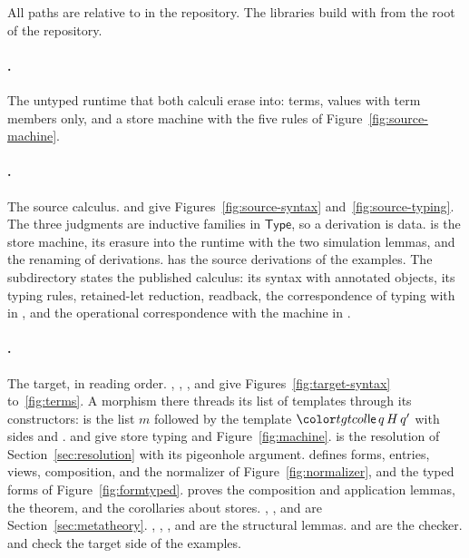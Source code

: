 All paths are relative to  in the repository. The libraries build with  from the root of the repository.

\paragraph{.}
The untyped runtime that both calculi erase into: terms, values with term members only, and a store machine with the five rules of Figure~\ref{fig:source-machine}.

\paragraph{.}
The source calculus.  and  give Figures~\ref{fig:source-syntax} and~\ref{fig:source-typing}. The three judgments are inductive families in $\mathsf{Type}$, so a derivation is data.  is the store machine,  its erasure into the runtime with the two simulation lemmas, and  the renaming of derivations.  has the source derivations of the examples. The subdirectory  states the published calculus: its syntax with annotated objects, its typing rules, retained-let reduction, readback, the correspondence of typing with \DOTMNF in , and the operational correspondence with the machine in .

\paragraph{.}
The target, in reading order. , , , and  give Figures~\ref{fig:target-syntax} to~\ref{fig:terms}. A morphism there threads its list of templates through its constructors:  is the list $m$ followed by the template $\ev{le}\,q\,H\,q'$ with sides  and .  and  give store typing and Figure~\ref{fig:machine}.  is the resolution of Section~\ref{sec:resolution} with its pigeonhole argument.  defines forms, entries, views, composition, and the normalizer of Figure~\ref{fig:normalizer}, and  the typed forms of Figure~\ref{fig:formtyped}.  proves the composition and application lemmas,  the theorem, and  the corollaries about stores. , , and  are Section~\ref{sec:metatheory}. , , , and  are the structural lemmas.  and  are the checker.  and  check the target side of the examples.

